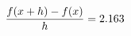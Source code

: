 \documentclass[preview]{standalone}
\begin{document}
\begin{align*}
\special{dvisvgm:raw <g id='unique000'>}\frac{f(x+h)-f(x)}{h} = 2.163\special{dvisvgm:raw </g>}
\end{align*}
\end{document}
